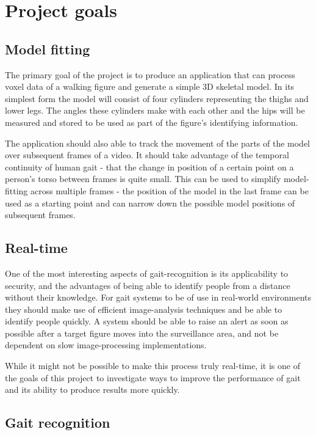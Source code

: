 \section{Project goals}

\subsection{Model fitting}

The primary goal of the project is to produce an application that can process voxel data of a walking figure and generate a simple 3D skeletal model.
In its simplest form the model will consist of four cylinders representing the thighs and lower legs.
The angles these cylinders make with each other and the hips will be measured and stored to be used as part of the figure's identifying information.

The application should also able to track the movement of the parts of the model over subsequent frames of a video.
It should take advantage of the temporal continuity of human gait - that the change in position of a certain point on a person's torso between frames is quite small.
This can be used to simplify model-fitting across multiple frames -
the position of the model in the last frame can be used as a starting point and can narrow down the possible model positions of subsequent frames.


\subsection{Real-time}

One of the most interesting aspects of gait-recognition is its applicability to security, and the advantages of being able to identify people from a distance without their knowledge.
For gait systems to be of use in real-world environments they should make use of efficient image-analysis techniques and be able to identify people quickly.
A system should be able to raise an alert as soon as possible after a target figure moves into the surveillance area, and not be dependent on slow image-processing implementations.

While it might not be possible to make this process truly real-time, it is one of the goals of this project to investigate ways to improve the performance of gait and its ability to produce results more quickly.


\subsection{Gait recognition}

